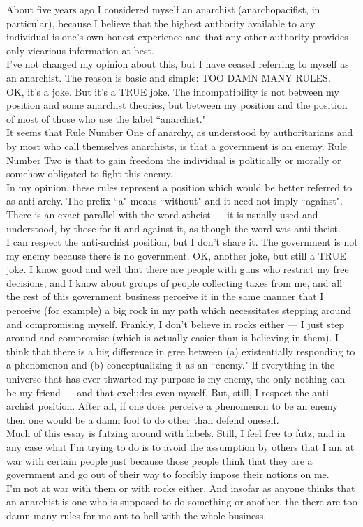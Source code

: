 \documentclass[12pt, onecolumn, letterpaper, oneside]{book}
\begin{document}
About five years ago I considered myself an anarchist (anarchopacifist, in particular), because I believe that the highest authority available to any individual is one's own honest experience and that any other authority provides only vicarious information at best.\\
I've not changed my opinion about this, but I have ceased referring to myself as an anarchist. The reason is basic and simple: TOO DAMN MANY RULES.\\
OK, it's a joke. But it's a TRUE joke. The incompatibility is not between my position and some anarchist theories, but between my position and the position of most of those who use the label ``anarchist."\\
It seems that Rule Number One of anarchy, as understood by authoritarians and by most who call themselves anarchists, is that a government is an enemy. Rule Number Two is that to gain freedom the individual is politically or morally or somehow obligated to fight this enemy.\\
In my opinion, these rules represent a position which would be better referred to as anti-archy. The prefix ``a" means ``without" and it need not imply ``against". There is an exact parallel with the word atheist --- it is usually used and understood, by those for it and against it, as though the word was anti-theist.\\
I can respect the anti-archist position, but I don't share it. The government is not my enemy because there is no government. OK, another joke, but still a TRUE joke. I know good and well that there are people with guns who restrict my free decisions, and I know about groups of people collecting taxes from me, and all the rest of this government business perceive it in the same manner that I perceive (for example) a big rock in my path which necessitates stepping around and compromising myself. Frankly, I don't believe in rocks either --- I just step around and compromise (which is actually easier than is believing in them). I think that there is a big difference in gree between (a) existentially responding to a phenomenon and (b) conceptualizing it as an ``enemy." If everything in the universe that has ever thwarted my purpose is my enemy, the only nothing can be my friend --- and that excludes even myself. But, still, I respect the anti-archist position. After all, if one does perceive a phenomenon to be an enemy then one would be a damn fool to do other than defend oneself.\\
Much of this essay is futzing around with labels. Still, I feel free to futz, and in any case what I'm trying to do is to avoid the assumption by others that I am at war with certain people just because those people think that they are a government and go out of their way to forcibly impose their notions on me.\\
I'm not at war with them or with rocks either. And insofar as anyone thinks that an anarchist is one who is supposed to do something or another, the there are too damn many rules for me ant to hell with the whole business.
\end{document}
